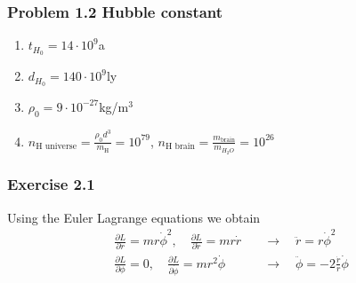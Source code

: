\documentclass[10pt,a4paper]{book}
\theoremstyle{definition}
\begin{document}
\subsubsection{Problem 1.2 Hubble constant}
\begin{enumerate}
\item $t_{H_0}=14\cdot10^{9}$a
\item $d_{H_0}=140\cdot10^{9}$ly
\item $\rho_0=9\cdot10^{-27}$kg/m$^3$
\item $n_\text{H universe}=\frac{\rho_0 d^3}{m_\text{H}}=10^{79}$, $n_\text{H brain}=\frac{m_\text{brain}}{m_{H_2O}}=10^{26}$
\end{enumerate}

\subsubsection{Exercise 2.1}
Using the Euler Lagrange equations we obtain
\begin{align}
\frac{\partial L}{\partial r}=mr\dot\phi^2,\quad\frac{\partial L}{\partial\dot r}=mr\dot r\quad&\rightarrow\quad\ddot r=r\dot\phi^2\\
\frac{\partial L}{\partial \phi}=0,\quad\frac{\partial L}{\partial\dot\phi}=mr^2\dot \phi\quad&\rightarrow\quad\ddot\phi=-2\frac{\dot r}{r}\dot\phi
\end{align}
\end{document}
